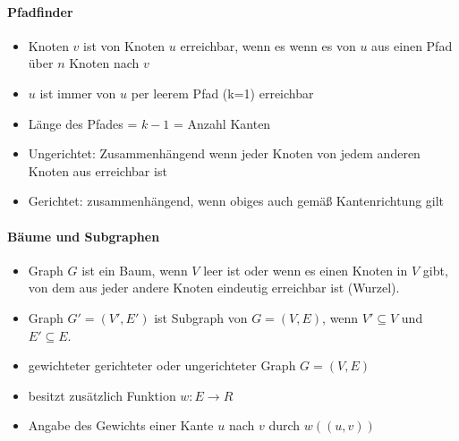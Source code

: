 \documentclass[
    ngerman,
    color=3b,
    dark_mode,
    load_common, %
    summary,
    boxarc,
]{tuda_summary}
\begin{document}
\paragraph{Pfadfinder}\mbox{}
\begin{grayInfoBox}
    \begin{itemize}
        \item Knoten $v$ ist von Knoten $u$ erreichbar, wenn es wenn es von $u$ aus einen Pfad über $n$ Knoten nach $v$
        \item $u$ ist immer von $u$ per leerem Pfad (k=1) erreichbar
        \item Länge des Pfades = $k - 1$ = Anzahl Kanten
    \end{itemize}
\end{grayInfoBox}

\begin{definition}\mbox{}
    \begin{itemize}
        \item Ungerichtet: Zusammenhängend wenn jeder Knoten von jedem anderen Knoten aus erreichbar ist
        \item Gerichtet:  zusammenhängend, wenn obiges auch gemä\ss{} Kantenrichtung gilt
    \end{itemize}
\end{definition}

\paragraph{Bäume und Subgraphen}\mbox{}
\begin{grayInfoBox}
    \begin{itemize}
        \item Graph $G$ ist ein Baum, wenn $V$ leer ist oder wenn es einen Knoten in $V$ gibt,
              von dem aus jeder andere Knoten eindeutig erreichbar ist (Wurzel).
        \item Graph $G'=(V',E')$ ist Subgraph von $G=(V,E)$, wenn $V'\subseteq V$ und $E' \subseteq E$.
    \end{itemize}
\end{grayInfoBox}

\begin{definition}\mbox{}
    \begin{itemize}
        \item gewichteter gerichteter oder ungerichteter Graph $G=(V,E)$
        \item besitzt zusätzlich Funktion $w: E \rightarrow R$
        \item Angabe des Gewichts einer Kante $u$ nach $v$ durch $w((u,v))$
    \end{itemize}
\end{definition}
\clearpage
\end{document}
